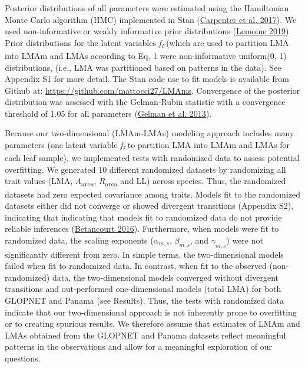 \documentclass[
  12pt,
  letterpaper,
  DIV=11,
  numbers=noendperiod]{scrartcl}
\begin{document}
Posterior distributions of all parameters were estimated using the
Hamiltonian Monte Carlo algorithm (HMC) implemented in Stan
(\protect\hyperlink{ref-Carpenter2017}{Carpenter et al. 2017}). We used
non-informative or weakly informative prior distributions
(\protect\hyperlink{ref-Lemoine2019}{Lemoine 2019}). Prior distributions
for the latent variables \emph{f\textsubscript{i}} (which are used to
partition LMA into LMAm and LMAs according to Eq. 1 were non-informative
uniform(0, 1) distributions, (i.e., LMA was partitioned based on
patterns in the data). See Appendix S1 for more detail. The Stan code
use to fit models is available from Github at:
\url{https://github.com/mattocci27/LMAms}. Convergence of the posterior
distribution was assessed with the Gelman-Rubin statistic with a
convergence threshold of 1.05 for all parameters
(\protect\hyperlink{ref-Gelman2013}{Gelman et al. 2013}).

Because our two-dimensional (LMAm-LMAs) modeling approach includes many
parameters (one latent variable \emph{f\textsubscript{i}} to partition
LMA into LMAm and LMAs for each leaf sample), we implemented tests with
randomized data to assess potential overfitting. We generated 10
different randomized datasets by randomizing all trait values (LMA,
\emph{A}\textsubscript{area}, \emph{R}\textsubscript{area} and LL)
across species. Thus, the randomized datasets had zero expected
covariance among traits. Models fit to the randomized datasets either
did not converge or showed divergent transitions (Appendix S2),
indicating that indicating that models fit to randomized data do not
provide reliable inferences
(\protect\hyperlink{ref-Betancourt2016}{Betancourt 2016}). Furthermore,
when models were fit to randomized data, the scaling exponents
(\(\alpha_{m,s}\), \(\beta_{m,s}\), and \(\gamma_{m,s}\)) were not
significantly different from zero. In simple terms, the two-dimensional
models failed when fit to randomized data. In contrast, when fit to the
observed (non-randomized) data, the two-dimensional models converged
without divergent transitions and out-performed one-dimensional models
(total LMA) for both GLOPNET and Panama (see Results). Thus, the tests
with randomized data indicate that our two-dimensional approach is not
inherently prone to overfitting or to creating spurious results. We
therefore assume that estimates of LMAm and LMAs obtained from the
GLOPNET and Panama datasets reflect meaningful patterns in the
observations and allow for a meaningful exploration of our questions.
\end{document}
